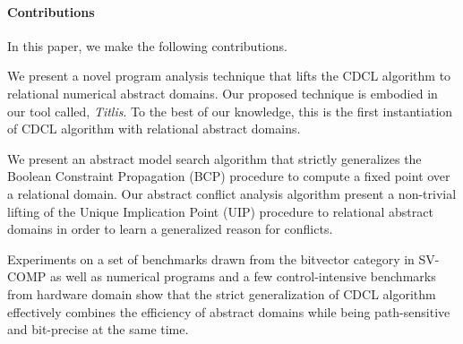 \paragraph{Contributions}
In this paper, we make the following contributions.
\begin{compactenum}
\item We present a novel program analysis technique that 
lifts the CDCL algorithm to relational numerical abstract domains.   
Our proposed technique is embodied in our tool called, {\em
  Titlis}.   
To the best of our knowledge, this is the first instantiation of CDCL 
algorithm with relational abstract domains. 

\item We present an abstract model search algorithm that strictly 
generalizes the Boolean Constraint Propagation (BCP) procedure to
compute a fixed point over a relational domain.  Our abstract conflict analysis algorithm present a non-trivial 
lifting of the Unique Implication Point (UIP) procedure to relational abstract 
domains in order to learn a generalized reason for conflicts.  
 
\item  Experiments on a set of benchmarks drawn from the bitvector 
category in SV-COMP as well as numerical programs and a few 
control-intensive benchmarks from hardware domain show that 
the strict generalization of CDCL algorithm effectively combines 
the efficiency of abstract domains while being path-sensitive and 
bit-precise at the same time.  
\end{compactenum}
